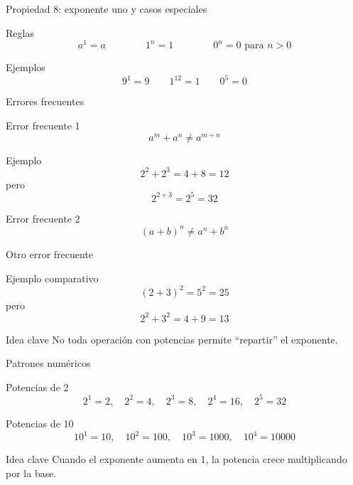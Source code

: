 \documentclass[aspectratio=169,10pt,handout]{beamer}
\newcommand{\pp}{\pause}
\newenvironment{ideaBox}
{\begin{exampleblock}{Idea clave}}
	{\end{exampleblock}}
\begin{document}
	\begin{frame}{Propiedad 8: exponente uno y casos especiales}
		\begin{block}{Reglas}
			\[
			a^1=a
			\qquad\qquad
			1^n=1
			\qquad\qquad
			0^n=0 \text{ para } n>0
			\]
		\end{block}
		
		\begin{exampleblock}{Ejemplos}
			\[
			9^1=9
			\qquad
			1^{12}=1
			\qquad
			0^5=0
			\]
		\end{exampleblock}
	\end{frame}
	
	\begin{frame}{Errores frecuentes}
		\begin{alertblock}{Error frecuente 1}
			\[
			a^m+a^n \neq a^{m+n}
			\]
		\end{alertblock}
		
		\begin{exampleblock}{Ejemplo}
			\[
			2^2+2^3=4+8=12
			\]
			pero
			\[
			2^{2+3}=2^5=32
			\]
		\end{exampleblock}
		
		\pp
		
		\begin{alertblock}{Error frecuente 2}
			\[
			(a+b)^n \neq a^n+b^n
			\]
		\end{alertblock}
	\end{frame}
	
	\begin{frame}{Otro error frecuente}
		\begin{exampleblock}{Ejemplo comparativo}
			\[
			(2+3)^2 = 5^2 = 25
			\]
			pero
			\[
			2^2+3^2=4+9=13
			\]
		\end{exampleblock}
		
		\begin{ideaBox}
			No toda operación con potencias permite “repartir” el exponente.
		\end{ideaBox}
	\end{frame}
	
	\begin{frame}{Patrones numéricos}
		\begin{block}{Potencias de 2}
			\[
			2^1=2,\quad 2^2=4,\quad 2^3=8,\quad 2^4=16,\quad 2^5=32
			\]
		\end{block}
		
		\pp
		
		\begin{block}{Potencias de 10}
			\[
			10^1=10,\quad 10^2=100,\quad 10^3=1000,\quad 10^4=10000
			\]
		\end{block}
		
		\pp
		
		\begin{ideaBox}
			Cuando el exponente aumenta en 1, la potencia crece multiplicando por la base.
		\end{ideaBox}
	\end{frame}
	
\end{document}

